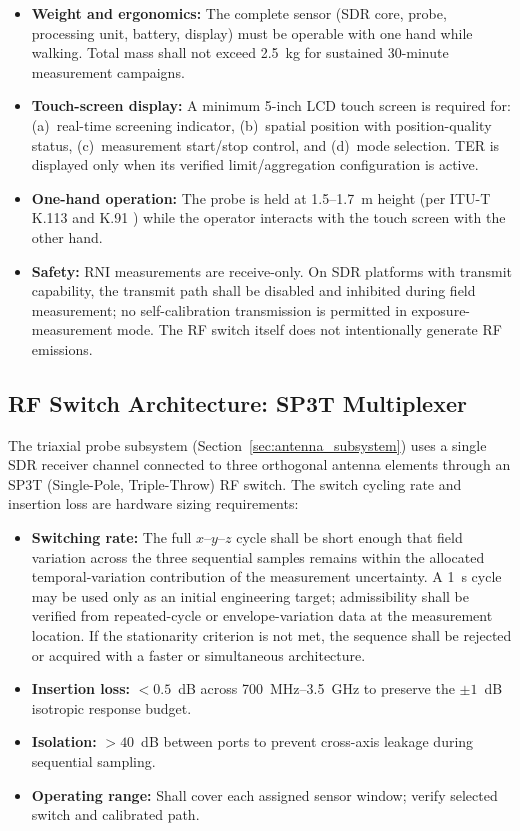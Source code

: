 \documentclass[11pt,a4paper]{article}
\begin{document}
\begin{itemize}
    \item \textbf{Weight and ergonomics:} The complete sensor (SDR core, probe, processing unit, battery, display) must be operable with one hand while walking. Total mass shall not exceed 2.5~kg for sustained 30-minute measurement campaigns.
    \item \textbf{Touch-screen display:} A minimum 5-inch LCD touch screen is required for: (a)~real-time screening indicator, (b)~spatial position with position-quality status, (c)~measurement start/stop control, and (d)~mode selection. TER is displayed only when its verified limit/aggregation configuration is active.
    \item \textbf{One-hand operation:} The probe is held at 1.5--1.7~m height (per ITU-T K.113 \cite{itut_k113} and K.91 \cite{itut_k91}) while the operator interacts with the touch screen with the other hand.
    \item \textbf{Safety:} RNI measurements are receive-only. On SDR platforms with transmit capability, the transmit path shall be disabled and inhibited during field measurement; no self-calibration transmission is permitted in exposure-measurement mode. The RF switch itself does not intentionally generate RF emissions.
\end{itemize}

\subsection{RF Switch Architecture: SP3T Multiplexer}

The triaxial probe subsystem (Section~\ref{sec:antenna_subsystem}) uses a single SDR receiver channel connected to three orthogonal antenna elements through an SP3T (Single-Pole, Triple-Throw) RF switch. The switch cycling rate and insertion loss are hardware sizing requirements:

\begin{itemize}
    \item \textbf{Switching rate:} The full $x$--$y$--$z$ cycle shall be short enough that field variation across the three sequential samples remains within the allocated temporal-variation contribution of the measurement uncertainty. A 1~s cycle may be used only as an initial engineering target; admissibility shall be verified from repeated-cycle or envelope-variation data at the measurement location. If the stationarity criterion is not met, the sequence shall be rejected or acquired with a faster or simultaneous architecture.
    \item \textbf{Insertion loss:} $< 0.5$~dB across 700~MHz--3.5~GHz to preserve the $\pm 1$~dB isotropic response budget.
    \item \textbf{Isolation:} $> 40$~dB between ports to prevent cross-axis leakage during sequential sampling.
    \item \textbf{Operating range:} Shall cover each assigned sensor window; verify selected switch and calibrated path.
\end{itemize}
\end{document}
